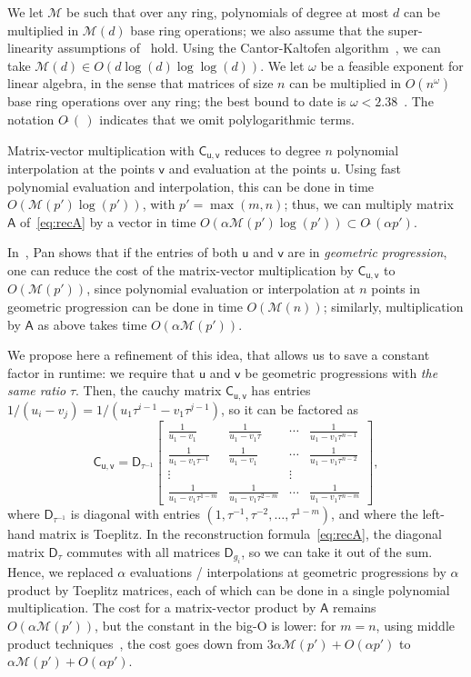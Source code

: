 \documentclass{sig-alternate}
\newcommand{\vu}{\ensuremath{\mathsf{u}}}
\newcommand{\vv}{\ensuremath{\mathsf{v}}}
\newcommand{\mA}{\ensuremath{\mathsf{A}}}
\newcommand{\mC}{\ensuremath{\mathsf{C}}}
\newcommand{\mD}{\ensuremath{\mathsf{D}}}
\newcommand{\M}{\ensuremath{\mathscr{M}}}
\newcommand{\Otilde}[1]{\ensuremath{O\tilde{~}(#1)}} %
\begin{document}
We let $\M$ be such that over any ring, polynomials of degree at most
$d$ can be multiplied in $\M(d)$ base ring operations; we also assume
that the super-linearity assumptions of~\cite[Chapter~8]{GaGe13}
hold. Using the Cantor-Kaltofen algorithm~\cite{CaKa91}, we can take
$\M(d)\in O(d \log(d)\log\log(d))$. We let $\omega$ be a feasible
exponent for linear algebra, in the sense that matrices of size $n$
can be multiplied in $O(n^\omega)$ base ring operations over any ring;
the best bound to date is $\omega < 2.38$~\cite{CoWi90, LeGall14}.
The notation $\Otilde{\,}$ indicates that we omit polylogarithmic
terms.

Matrix-vector multiplication with $\mC_{\vu,\vv}$ reduces to degree
$n$ polynomial interpolation at the points $\vv$ and evaluation at the
points $\vu$. Using fast polynomial evaluation and interpolation, this
can be done in time $O(\M(p')\log(p'))$, with $p'=\max(m,n)$; thus, we
can multiply matrix $\mA$ of~\eqref{eq:recA} by a vector in time
$O(\alpha \M(p')\log(p'))\subset \Otilde{\alpha p'}$.

In~\cite[Theorem~4.7.3]{Pan01}, Pan shows that if the entries of both
$\vu$ and $\vv$ are in {\em geometric progression}, one can reduce the
cost of the matrix-vector multiplication by $\mC_{\vu,\vv}$ to
$O(\M(p'))$, since polynomial evaluation or interpolation at $n$
points in geometric progression can be done in time $O(\M(n))$;
similarly, multiplication by $\mA$ as above takes time
$O(\alpha\M(p'))$.

We propose here a refinement of this idea, that allows us to
save a constant factor in runtime: we require that $\vu$ and $\vv$ be
geometric progressions with {\em the same ratio} $\tau$. Then, the
cauchy matrix $\mC_{\vu,\vv}$ has entries $1/(u_i -
v_j) = 1/(u_1 \tau^{i-1} - v_1 \tau^{j-1})$, so it can be factored as
$$\mC_{\vu,\vv}=\mD_{\tau^{-1}}
\begin{bmatrix}
\frac 1{u_1 - v_1} & \frac 1{u_1 - v_1 \tau} & \cdots & \frac 1{u_1-v_1 \tau^{n-1}}\\
\frac 1{u_1 - v_1 \tau^{-1}}  & \frac 1{u_1 - v_1} & \cdots & \frac 1{u_1-v_1 \tau^{n-2}}\\
\vdots & & \vdots \\
\frac 1{u_1 - v_1 \tau^{1-m}}  & \frac 1{u_1 - v_1 \tau^{2-m}} & \cdots & \frac 1{u_1-v_1 \tau^{n-m}}
\end{bmatrix},$$
where $\mD_{\tau^{-1}}$ is diagonal with entries
$(1,\tau^{-1},\tau^{-2},\dots,\tau^{1-m})$, and where the left-hand matrix
is Toeplitz. In the reconstruction formula~\eqref{eq:recA}, the
diagonal matrix $\mD_\tau$ commutes with all matrices $\mD_{g_i}$, so
we can take it out of the sum. Hence, we replaced $\alpha$ evaluations
/ interpolations at geometric progressions by $\alpha$ product by
Toeplitz matrices, each of which can be done in a single polynomial
multiplication. The cost for a matrix-vector product by $\mA$ remains
$O(\alpha \M(p'))$, but the constant in the big-O is lower: for $m=n$,
using middle product techniques~\cite{HaQuZi04,BoLeSc03,BoSc05}, the
cost goes down from $3\alpha \M(p') +O(\alpha p')$ to $\alpha \M(p')
+O(\alpha p')$. 
\end{document}
